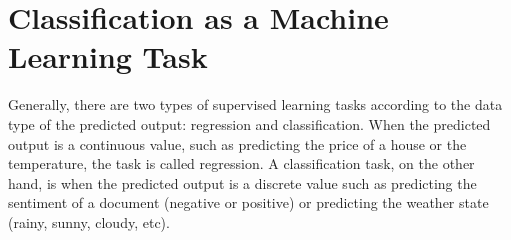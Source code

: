 %
%

\section{Classification as a Machine Learning Task}
Generally, there are two types of supervised learning tasks according to the data type of the predicted output: regression and classification. When the predicted output is a continuous value, such as predicting the price of a house or the temperature, the task is called regression. A classification task, on the other hand, is when the predicted output is a discrete value such as predicting the sentiment of a document (negative or positive) or predicting the weather state (rainy, sunny, cloudy, etc). 

